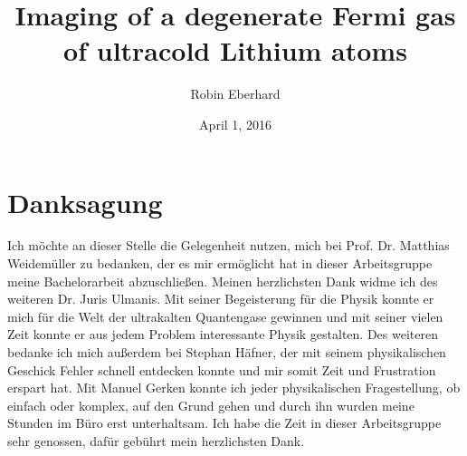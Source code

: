 \documentclass[
	12pt, %
	parskip=half, %
	digital, %
	twoside, %
	openright, %
]{bsc}
\title{Imaging of a degenerate Fermi gas of ultracold Lithium atoms}
\author{Robin Eberhard}
\date{April 1, 2016}
\begin{document}




\tableofcontents

\cleardoublepage{}



\listoffigures

{}


\chapter*{Danksagung}
Ich möchte an dieser Stelle die Gelegenheit nutzen, mich bei Prof. Dr. Matthias Weidemüller zu bedanken, der es mir ermöglicht hat in dieser Arbeitsgruppe meine Bachelorarbeit abzuschließen. Meinen herzlichsten Dank widme ich des weiteren Dr. Juris Ulmanis. Mit seiner Begeisterung für die Physik konnte er mich für die Welt der ultrakalten Quantengase gewinnen und mit seiner vielen Zeit konnte er aus jedem Problem interessante Physik gestalten. Des weiteren bedanke ich mich außerdem bei Stephan Häfner, der mit seinem physikalischen Geschick Fehler schnell entdecken konnte und mir somit Zeit und Frustration erspart hat. Mit Manuel Gerken konnte ich jeder physikalischen Fragestellung, ob einfach oder komplex, auf den Grund gehen und durch ihn wurden meine Stunden im Büro erst unterhaltsam. Ich habe die Zeit in dieser Arbeitsgruppe sehr genossen, dafür gebührt mein herzlichsten Dank.


\end{document}
